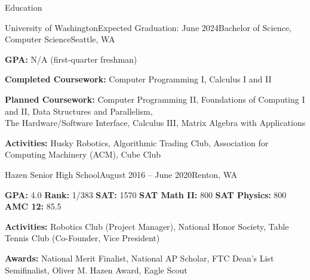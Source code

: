 \documentclass{resume} %
\begin{document}
\vspace{-1.0em} %


\begin{rSection}{Education}

\begin{education}{University of Washington}{Expected Graduation: June 2024}{Bachelor of Science, Computer Science}{Seattle, WA}
\item {\bf GPA:} N/A (first-quarter freshman)
\item {\bf Completed Coursework:} Computer Programming I, Calculus I and II
\item {\bf Planned Coursework:} Computer Programming II, Foundations of Computing I and II, Data Structures and Parallelism, \\ The Hardware/Software Interface, Calculus III, Matrix Algebra with Applications
\item {\bf Activities:} Husky Robotics, Algorithmic Trading Club, Association for Computing Machinery (ACM), Cube Club
\end{education}

\begin{education}{Hazen Senior High School}{August 2016 – June 2020}{}{Renton, WA}
\item {\bf GPA:} 4.0 \hspace{5mm} {\bf Rank:} 1/383 \hspace{5mm} {\bf SAT:} 1570 \hspace{5mm} {\bf SAT Math II:} 800 \hspace{5mm} {\bf SAT Physics:} 800 \hspace{5mm} {\bf AMC 12:} 85.5
\item {\bf Activities:} Robotics Club (Project Manager), National Honor Society, Table Tennis Club (Co-Founder, Vice President)
\item {\bf Awards:} National Merit Finalist, National AP Scholar, FTC Dean's List Semifinalist, Oliver M. Hazen Award, Eagle Scout
\end{education}

\end{rSection}

\end{document}
